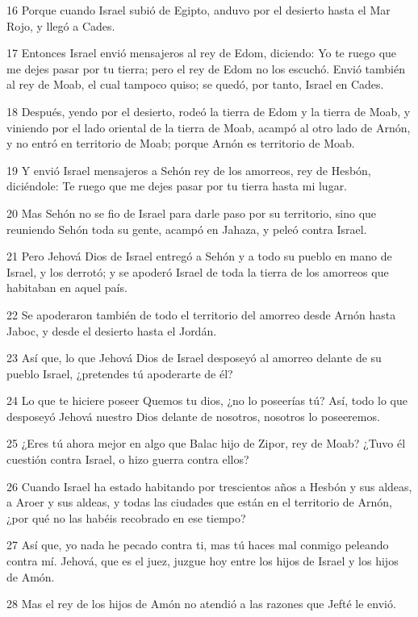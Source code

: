 \par 16 Porque cuando Israel subió de Egipto, anduvo por el desierto hasta el Mar Rojo, y llegó a Cades.
\par 17 Entonces Israel envió mensajeros al rey de Edom, diciendo: Yo te ruego que me dejes pasar por tu tierra; pero el rey de Edom no los escuchó. Envió también al rey de Moab, el cual tampoco quiso; se quedó, por tanto, Israel en Cades.
\par 18 Después, yendo por el desierto, rodeó la tierra de Edom y la tierra de Moab, y viniendo por el lado oriental de la tierra de Moab, acampó al otro lado de Arnón, y no entró en territorio de Moab; porque Arnón es territorio de Moab.
\par 19 Y envió Israel mensajeros a Sehón rey de los amorreos, rey de Hesbón, diciéndole: Te ruego que me dejes pasar por tu tierra hasta mi lugar.
\par 20 Mas Sehón no se fio de Israel para darle paso por su territorio, sino que reuniendo Sehón toda su gente, acampó en Jahaza, y peleó contra Israel.
\par 21 Pero Jehová Dios de Israel entregó a Sehón y a todo su pueblo en mano de Israel, y los derrotó; y se apoderó Israel de toda la tierra de los amorreos que habitaban en aquel país.
\par 22 Se apoderaron también de todo el territorio del amorreo desde Arnón hasta Jaboc, y desde el desierto hasta el Jordán. 
\par 23 Así que, lo que Jehová Dios de Israel desposeyó al amorreo delante de su pueblo Israel, ¿pretendes tú apoderarte de él?
\par 24 Lo que te hiciere poseer Quemos tu dios, ¿no lo poseerías tú? Así, todo lo que desposeyó Jehová nuestro Dios delante de nosotros, nosotros lo poseeremos.
\par 25 ¿Eres tú ahora mejor en algo que Balac hijo de Zipor, rey de Moab? ¿Tuvo él cuestión contra Israel, o hizo guerra contra ellos?
\par 26 Cuando Israel ha estado habitando por trescientos años a Hesbón y sus aldeas, a Aroer y sus aldeas, y todas las ciudades que están en el territorio de Arnón, ¿por qué no las habéis recobrado en ese tiempo? 
\par 27 Así que, yo nada he pecado contra ti, mas tú haces mal conmigo peleando contra mí. Jehová, que es el juez, juzgue hoy entre los hijos de Israel y los hijos de Amón.
\par 28 Mas el rey de los hijos de Amón no atendió a las razones que Jefté le envió.
